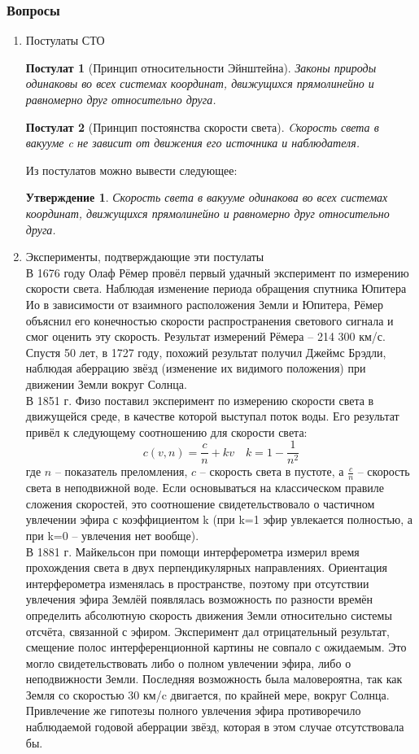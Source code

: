 \documentclass[12pt]{article}
\newtheorem{postulat}{Постулат}
\newtheorem{utv}{Утверждение}
\begin{document}
\subsubsection{Вопросы}
\begin{enumerate}
    \item Постулаты СТО
    \begin{postulat}[Принцип относительности Эйнштейна]
    Законы природы одинаковы во всех системах координат, движущихся прямолинейно и равномерно друг относительно друга.
    \end{postulat}
    \begin{postulat}[Принцип постоянства скорости света]
    Cкорость света в вакууме c не зависит от движения его источника и наблюдателя.
    \end{postulat}
    Из постулатов можно вывести следующее:
    \begin{utv}
    Скорость света в вакууме одинакова во всех системах координат, движущихся прямолинейно и равномерно друг относительно друга.
    \end{utv}
    \item Эксперименты, подтверждающие эти постулаты\\
    В 1676 году Олаф Рёмер провёл первый удачный эксперимент по измерению скорости света. Наблюдая изменение периода обращения спутника Юпитера Ио в зависимости от взаимного расположения Земли и Юпитера, Рёмер объяснил его конечностью скорости распространения светового сигнала и смог оценить эту скорость. Результат измерений Рёмера -- 214 300 км/с. Спустя 50 лет, в 1727 году, похожий результат получил Джеймс Брэдли, наблюдая аберрацию звёзд (изменение их видимого положения) при движении Земли вокруг Солнца.\\
    В 1851 г. Физо поставил эксперимент по измерению скорости света в движущейся среде, в качестве которой выступал поток воды. Его результат привёл к следующему соотношению для скорости света:
    \begin{equation}
        c(v,n) = \frac{c}{n}+kv\quad k = 1 - \frac{1}{n^2}
    \end{equation}
    где $n$ -- показатель преломления, $c$ -- скорость света в пустоте, а $\frac{c}{n}$ -- скорость света в неподвижной воде. Если основываться на классическом правиле сложения скоростей, это соотношение свидетельствовало о частичном увлечении эфира с коэффициентом k (при k=1 эфир увлекается полностью, а при k=0 -- увлечения нет вообще).\\
    В 1881 г. Майкельсон при помощи интерферометра измерил время прохождения света в двух перпендикулярных направлениях. Ориентация интерферометра изменялась в пространстве, поэтому при отсутствии увлечения эфира Землёй появлялась возможность по разности времён определить абсолютную скорость движения Земли относительно системы отсчёта, связанной с эфиром. Эксперимент дал отрицательный результат, смещение полос интерференционной картины не совпало с ожидаемым. Это могло свидетельствовать либо о полном увлечении эфира, либо о неподвижности Земли. Последняя возможность была маловероятна, так как Земля со скоростью 30 км/c двигается, по крайней мере, вокруг Солнца. Привлечение же гипотезы полного увлечения эфира противоречило наблюдаемой годовой аберрации звёзд, которая в этом случае отсутствовала бы.

\end{enumerate}
\end{document}
